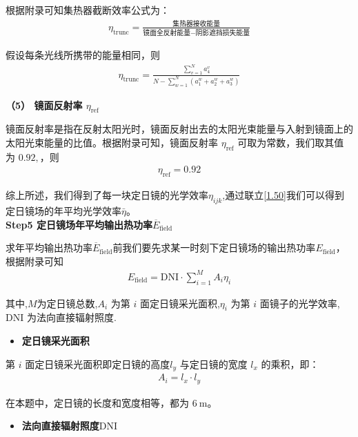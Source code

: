 \documentclass[../main.tex]{subfiles}
\begin{document}
\par 根据附录可知集热器截断效率公式为：
\begin{align}\label{1.44}
  \eta_{\text{trunc}} = \frac{\text{集热器接收能量}}{\text{镜面全反射能量} - \text{阴影遮挡损失能量}}
\end{align}
\par 假设每条光线所携带的能量相同，则
\begin{align}\label{1.45}
  \eta _{\text{trunc}}=\frac{\sum_{v=1}^N{a_4^v}}{N-\sum_{w=1}^N{\left( a_{1}^{w}+a_{2}^{w}+a_{3}^{w} \right)}}
\end{align}
\par \textbf{（5） 镜面反射率 $\eta_{\text{ref}}$}
\par 镜面反射率是指在反射太阳光时，镜面反射出去的太阳光束能量与入射到镜面上的太阳光束能量的比值。根据附录可知，镜面反射率 $\eta_{\text{ref}}$ 可取为常数，我们取其值为 $0.92,$，则
\begin{align}\label{1.46}
  \eta_{\text{ref}}=0.92
\end{align}
\par 综上所述，我们得到了每一块定日镜的光学效率\(\eta_{ijk}\),通过联立\eqref{1.50}我们可以得到定日镜场的年平均光学效率\(\bar{\eta}\)。
 \\ \noindent \textbf{Step5 定日镜场年平均输出热功率$\overline{E}_{\text{field}}$}
 \par 求年平均输出热功率$\overline{E}_{\text{field}}$前我们要先求某一时刻下定日镜场的输出热功率$E_{\text{field}}$，根据附录可知
 \begin{align}\label{1.47}
  E_{\text{field}} = \text{DNI} \cdot \sum_{i = 1}^{M} A_i \eta_i
 \end{align}
\par 其中,$M$为定日镜总数,$A_i$ 为第 $i$ 面定日镜采光面积,$\eta_i$ 为第 $i$ 面镜子的光学效率,$\text{DNI}$ 为法向直接辐射照度.
\begin{itemize}
  \item \textbf{定日镜采光面积}
\end{itemize}
\par 第 $i$ 面定日镜采光面积即定日镜的高度\( l_y \) 与定日镜的宽度 \( l_x \) 的乘积，即：
\begin{align}\label{1.48}
  A_i = l_x \cdot l_y
 \end{align}
\par 在本题中，定日镜的长度和宽度相等，都为 \( 6\ \text{m} \)。
\begin{itemize}
  \item \textbf{法向直接辐射照度$\text{DNI}$ }
\end{itemize}
\end{document}
